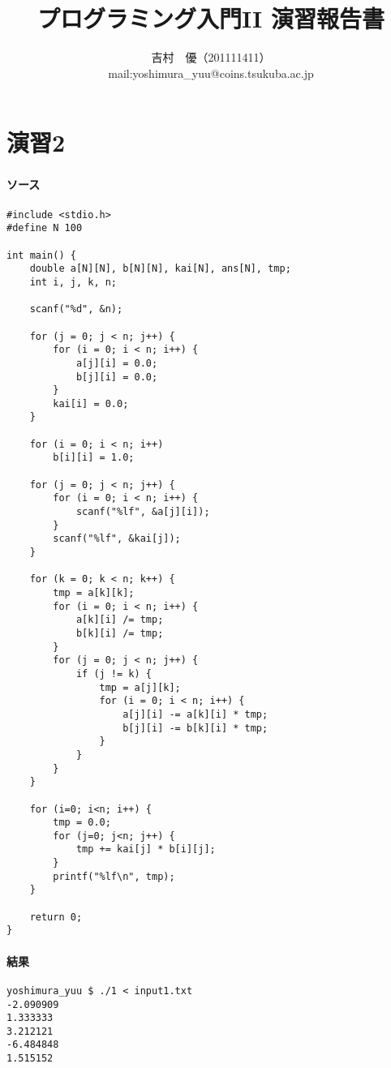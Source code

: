 \documentclass[11pt,a4paper,a4j]{jsarticle}
\title{プログラミング入門II 演習報告書}
\author{吉村　優（201111411）\\
mail:yoshimura\_yuu@coins.tsukuba.ac.jp}
\begin{document}
\maketitle

\part*{演習2}
\section{}
\subsection{ソース}
\begin{verbatim}
#include <stdio.h>
#define N 100

int main() {
    double a[N][N], b[N][N], kai[N], ans[N], tmp;
    int i, j, k, n;

    scanf("%d", &n);

    for (j = 0; j < n; j++) {
        for (i = 0; i < n; i++) {
            a[j][i] = 0.0;
            b[j][i] = 0.0;
        }
        kai[i] = 0.0;
    }

    for (i = 0; i < n; i++)
        b[i][i] = 1.0;

    for (j = 0; j < n; j++) {
        for (i = 0; i < n; i++) {
            scanf("%lf", &a[j][i]);
        }
        scanf("%lf", &kai[j]);
    }

    for (k = 0; k < n; k++) {
        tmp = a[k][k];
        for (i = 0; i < n; i++) {
            a[k][i] /= tmp;
            b[k][i] /= tmp;
        }
        for (j = 0; j < n; j++) {
            if (j != k) {
                tmp = a[j][k];
                for (i = 0; i < n; i++) {
                    a[j][i] -= a[k][i] * tmp;
                    b[j][i] -= b[k][i] * tmp;
                }
            }
        }
    }

    for (i=0; i<n; i++) {
        tmp = 0.0;
        for (j=0; j<n; j++) {
            tmp += kai[j] * b[i][j];
        }
        printf("%lf\n", tmp);
    }

    return 0;
}
\end{verbatim}

\subsection{結果}
\begin{shadebox}
\begin{verbatim}
yoshimura_yuu $ ./1 < input1.txt
-2.090909
1.333333
3.212121
-6.484848
1.515152
\end{verbatim}
\end{shadebox}
\end{document}
